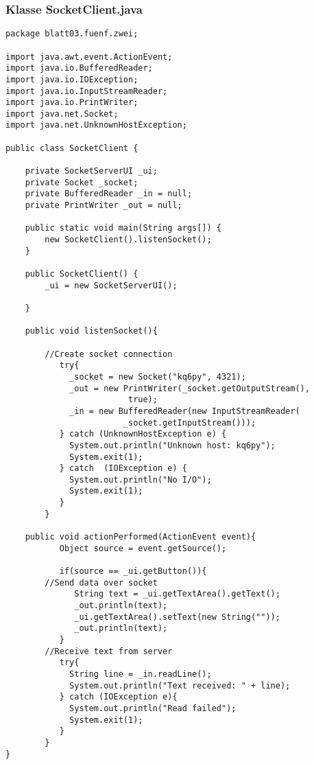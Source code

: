 \documentclass[twoside]{article}
\begin{document}
\subsubsection*{Klasse SocketClient.java}
\begin{lstlisting}
package blatt03.fuenf.zwei;

import java.awt.event.ActionEvent;
import java.io.BufferedReader;
import java.io.IOException;
import java.io.InputStreamReader;
import java.io.PrintWriter;
import java.net.Socket;
import java.net.UnknownHostException;

public class SocketClient {

	private SocketServerUI _ui;
	private Socket _socket;
	private BufferedReader _in = null;
	private PrintWriter _out = null;

	public static void main(String args[]) {
		new SocketClient().listenSocket();
	}

	public SocketClient() {
		_ui = new SocketServerUI();

	}
	
	public void listenSocket(){
		
		//Create socket connection
		   try{
		     _socket = new Socket("kq6py", 4321);
		     _out = new PrintWriter(_socket.getOutputStream(), 
		                 true);
		     _in = new BufferedReader(new InputStreamReader(
		                _socket.getInputStream()));
		   } catch (UnknownHostException e) {
		     System.out.println("Unknown host: kq6py");
		     System.exit(1);
		   } catch  (IOException e) {
		     System.out.println("No I/O");
		     System.exit(1);
		   }
		}
	
	public void actionPerformed(ActionEvent event){
		   Object source = event.getSource();

		   if(source == _ui.getButton()){
		//Send data over socket
		      String text = _ui.getTextArea().getText();
		      _out.println(text);
		      _ui.getTextArea().setText(new String(""));
		      _out.println(text);
		   }
		//Receive text from server
		   try{
		     String line = _in.readLine();
		     System.out.println("Text received: " + line);
		   } catch (IOException e){
		     System.out.println("Read failed");
		     System.exit(1);
		   }
		}  
}
\end{lstlisting}
\end{document}
